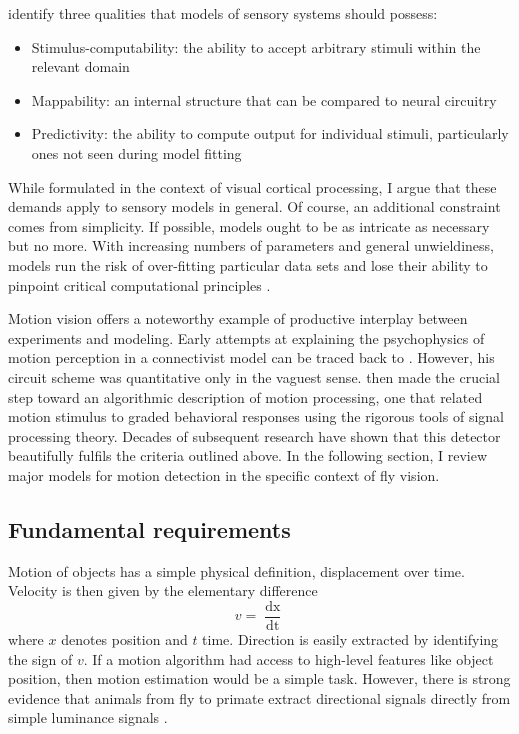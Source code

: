 \citet{Yamins:2016hg} identify three qualities that models of sensory systems should possess:
\begin{itemize}
    \item Stimulus-computability: the ability to accept arbitrary stimuli within the relevant domain
    \item Mappability: an internal structure that can be compared to neural circuitry
    \item Predictivity: the ability to compute output for individual stimuli, particularly ones not seen during model fitting
\end{itemize}
While formulated in the context of visual cortical processing, I argue that these demands apply to sensory models in general. Of course, an additional constraint comes from simplicity. If possible, models ought to be as intricate as necessary but no more. With increasing numbers of parameters and general unwieldiness, models run the risk of over-fitting particular data sets and lose their ability to pinpoint critical computational principles \citep[for an example of a large-scale model with possibly limited explanatory value, see][]{Markram:2015aa}. 

Motion vision offers a noteworthy example of productive interplay between experiments and modeling. Early attempts at explaining the psychophysics of motion perception in a connectivist model can be traced back to \citet{Exner:1894aa}. However, his circuit scheme was quantitative only in the vaguest sense. \citet{Hassenstein:1956fa} then made the crucial step toward an algorithmic description of motion processing, one that related motion stimulus to graded behavioral responses using the rigorous tools of signal processing theory. Decades of subsequent research have shown that this detector beautifully fulfils the criteria outlined above. In the following section, I review major models for motion detection in the specific context of fly vision.

\subsection{Fundamental requirements}

Motion of objects has a simple physical definition, displacement over time. Velocity is then given by the elementary difference
\begin{equation}
    v = \frac{\mathop{dx}}{\mathop{dt}}
\end{equation}
where $x$ denotes position and $t$ time. Direction is easily extracted by identifying the sign of $v$. If a motion algorithm had access to high-level features like object position, then motion estimation would be a simple task. However, there is strong evidence that animals from fly to primate extract directional signals directly from simple luminance signals \citep{Borst:2011bq,Adelson:1985tx}.

